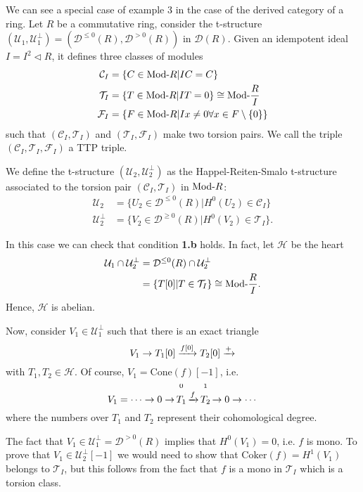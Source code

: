 We can see a special case of example 3 in the case of the derived category of a ring.
Let $R$ be a commutative ring, consider the t-structure $(\mathcal{U}_1,\mathcal{U}_1^\perp)=(\mathcal{D}^{\leq 0}(R), \mathcal{D}^{>0}(R))$
in $\mathcal{D}(R)$. Given an idempotent ideal $I=I^2\lhd R$, it defines three classes of modules
\begin{align*}
  \mathcal{C}_I &= \{ C\in\mathrm{\textup{Mod-}}R | IC=C\}\\
  \mathcal{T}_I &= \{ T\in\mathrm{\textup{Mod-}}R | IT=0\} \cong \mathrm{\textup{Mod-}}\frac{R}{I}\\
  \mathcal{F}_I &= \{ F\in\mathrm{\textup{Mod-}}R | Ix \neq 0 \forall x\in F\setminus \{0\} \}
\end{align*}
such that $(\mathcal{C}_I, \mathcal{T}_I)$ and $(\mathcal{T}_I,\mathcal{F}_I)$ make two torsion pairs.
We call the triple $(\mathcal{C}_I,\mathcal{T}_I,\mathcal{F}_I)$ a TTP triple.

We define the t-structure $(\mathcal{U}_2,\mathcal{U}_2^\perp)$ as the Happel-Reiten-Smalo t-structure
associated to the torsion pair $(\mathcal{C}_I,\mathcal{T}_I)$ in $\mathrm{\textup{Mod-}}R$:
\begin{align*}
  \mathcal{U}_2 &= \{ U_2\in\mathcal{D}^{\leq 0}(R) | H^0(U_2)\in\mathcal{C}_I \} \\
  \mathcal{U}_2^\perp &= \{ V_2\in\mathcal{D}^{\geq 0}(R) | H^0(V_2)\in\mathcal{T}_I \}.
\end{align*}

In this case we can check that condition \textbf{1.b} holds. In fact, let $\mathcal{H}$ be the heart
\begin{align*}
  \mathcal{U}_1\cap\mathcal{U}_2^\perp &= \mathcal{D}^{\leq 0}(R)\cap \mathcal{U}_2^\perp \\
  &= \{ T[0] | T\in\mathcal{T}_I \} \cong \mathrm{\textup{Mod-}}\frac{R}{I}.
\end{align*}
Hence, $\mathcal{H}$ is abelian.

Now, consider $V_1\in\mathcal{U}_1^\perp$ such that there is an exact triangle
\begin{equation*}
  V_1\to T_1[0]\xrightarrow{f[0]}T_2[0]\xrightarrow{+}
\end{equation*}
with $T_1,T_2\in\mathcal{H}$. Of course, $V_1 = \mathrm{Cone}(f)[-1]$, i.e.
\begin{equation*}
  V_1 = \cdots \to0\to\,\oset[2ex]{\small 0}{T_1}\,\nto{f}\,\oset[2ex]{\small 1}{T_2}\,\to 0\to \cdots
\end{equation*}
where the numbers over $T_1$ and $T_2$ represent their cohomological degree.

The fact that $V_1\in\mathcal{U}_1^\perp = \mathcal{D}^{> 0}(R)$ implies that $H^0(V_1)=0$, i.e. $f$ is mono.
To prove that $V_1\in\mathcal{U}_2^\perp[-1]$ we would need to show that $\mathrm{Coker}(f)=H^1(V_1)$ belongs to $\mathcal{T}_I$,
but this follows from the fact that $f$ is a mono in $\mathcal{T}_I$ which is a torsion class.
